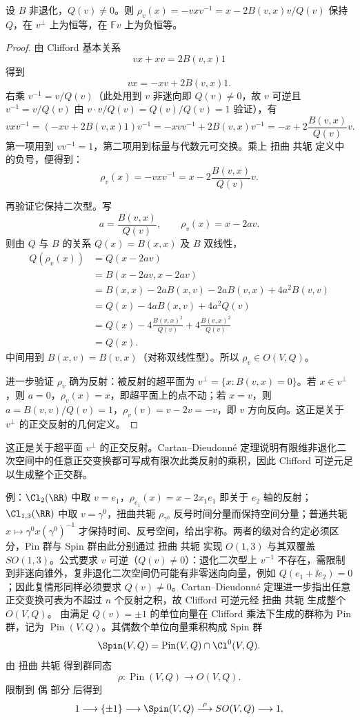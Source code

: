 \begin{proposition}[非迷向向量实现正交反射]
设 $B$ 非退化，$Q(v)\ne0$。则 $\rho_v(x)=-vxv^{-1}=x-2B(v,x)v/Q(v)$ 保持 $Q$，在 $v^\perp$ 上为恒等，在 $\mathbb Fv$ 上为负恒等。
\end{proposition}
\begin{proof}
由 Clifford 基本关系
\[
vx+xv=2B(v,x)1
\]
得到
\[
vx=-xv+2B(v,x)1.
\]
右乘 $v^{-1}=v/Q(v)$（此处用到 $v$ 非迷向即 $Q(v)\neq0$，故 $v$ 可逆且 $v^{-1}=v/Q(v)$ 由 $v\cdot v/Q(v)=Q(v)/Q(v)=1$ 验证），有
\[
vxv^{-1}
=(-xv+2B(v,x)1)v^{-1}
=-xvv^{-1}+2B(v,x)v^{-1}
=-x+2\frac{B(v,x)}{Q(v)}v.
\]
第一项用到 $vv^{-1}=1$，第二项用到标量与代数元可交换。乘上 扭曲 共轭 定义中的负号，便得到：
\[
\rho_v(x)=-vxv^{-1}=x-2\frac{B(v,x)}{Q(v)}v.
\]

再验证它保持二次型。写
\[
a=\frac{B(v,x)}{Q(v)},
\qquad
\rho_v(x)=x-2av.
\]
则由 $Q$ 与 $B$ 的关系 $Q(x)=B(x,x)$ 及 $B$ 双线性，
\[
\begin{aligned}
Q(\rho_v(x))
&=Q(x-2av)\\
&=B(x-2av,x-2av)\\
&=B(x,x)-2aB(x,v)-2aB(v,x)+4a^2B(v,v)\\
&=Q(x)-4aB(x,v)+4a^2Q(v)\\
&=Q(x)
-4\frac{B(v,x)^2}{Q(v)}
+4\frac{B(v,x)^2}{Q(v)}\\
&=Q(x).
\end{aligned}
\]
中间用到 $B(x,v)=B(v,x)$（对称双线性型）。所以 $\rho_v\in O(V,Q)$。

进一步验证 $\rho_v$ 确为反射：被反射的超平面为 $v^\perp=\{x:B(v,x)=0\}$。若 $x\in v^\perp$，则 $a=0$，$\rho_v(x)=x$，即超平面上的点不动；若 $x=v$，则 $a=B(v,v)/Q(v)=1$，$\rho_v(v)=v-2v=-v$，即 $v$ 方向反向。这正是关于 $v^\perp$ 的正交反射的几何定义。
\end{proof}

这正是关于超平面 $v^\perp$ 的正交反射。Cartan--Dieudonn\'e 定理说明有限维非退化二次空间中的任意正交变换都可写成有限次此类反射的乘积，因此 Clifford 可逆元足以生成整个正交群。

例：$\Cl_2(\RR)$ 中取 $v=e_1$，$\rho_{e_1}(x)=x-2x_1e_1$ 即关于 $e_2$ 轴的反射；$\Cl_{1,3}(\RR)$ 中取 $v=\gamma^0$，扭曲共轭 $\rho_{\gamma^0}$ 反号时间分量而保持空间分量；普通共轭 $x\mapsto\gamma^0x(\gamma^0)^{-1}$ 才保持时间、反号空间，给出宇称。两者的级对合约定必须区分，Pin 群与 Spin 群由此分别通过 扭曲 共轭 实现 $O(1,3)$ 与其双覆盖 $SO(1,3)$。公式要求 $v$ 可逆（$Q(v)\ne0$）：退化二次型上 $v^{-1}$ 不存在，需限制到非迷向锥外，复非退化二次空间仍可能有非零迷向向量，例如 $Q(e_1+\ii e_2)=0$；因此复情形同样必须要求 $Q(v)\ne0$。Cartan--Dieudonn\'e 定理进一步指出任意正交变换可表为不超过 $n$ 个反射之积，故 Clifford 可逆元经 扭曲 共轭 生成整个 $O(V,Q)$。
由满足 $Q(v)=\pm1$ 的单位向量在 Clifford 乘法下生成的群称为 Pin 群，记为 $\operatorname{Pin}(V,Q)$。其偶数个单位向量乘积构成 Spin 群
\[
\Spin(V,Q)
=\operatorname{Pin}(V,Q)\cap\Cl^0(V,Q).
\]
由 扭曲 共轭 得到群同态
\[
\rho:\operatorname{Pin}(V,Q)\to O(V,Q).
\]
限制到 偶 部分 后得到
\begin{equation}
1\longrightarrow\{\pm1\}
\longrightarrow\Spin(V,Q)
\overset{\rho}{\longrightarrow}SO(V,Q)
\longrightarrow1,
\label{eq:spin-double-cover}
\end{equation}

